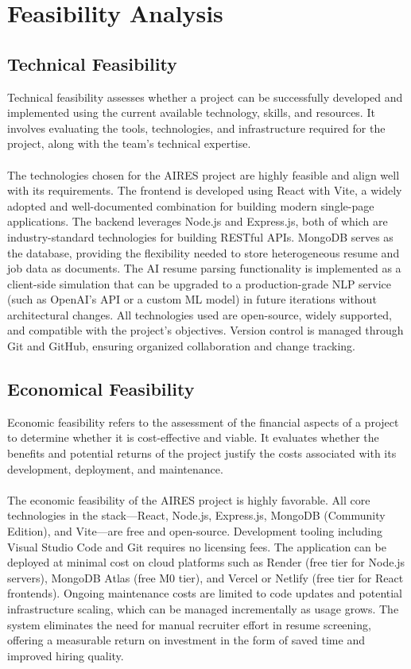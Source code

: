  \section{Feasibility Analysis}
 
 \subsection{Technical Feasibility}

 Technical feasibility assesses whether a project can be successfully developed and implemented using the current available technology, skills, and resources. It involves evaluating the tools, technologies, and infrastructure required for the project, along with the team's technical expertise.\\\\
 \noindent
The technologies chosen for the AIRES project are highly feasible and align well with its requirements. The frontend is developed using React with Vite, a widely adopted and well-documented combination for building modern single-page applications. The backend leverages Node.js and Express.js, both of which are industry-standard technologies for building RESTful APIs. MongoDB serves as the database, providing the flexibility needed to store heterogeneous resume and job data as documents. The AI resume parsing functionality is implemented as a client-side simulation that can be upgraded to a production-grade NLP service (such as OpenAI's API or a custom ML model) in future iterations without architectural changes. All technologies used are open-source, widely supported, and compatible with the project's objectives. Version control is managed through Git and GitHub, ensuring organized collaboration and change tracking.

 
 \subsection{Economical Feasibility}
 Economic feasibility refers to the assessment of the financial aspects of a project to determine whether it is cost-effective and viable. It evaluates whether the benefits and potential returns of the project justify the costs associated with its development, deployment, and maintenance.\\\\
 The economic feasibility of the AIRES project is highly favorable. All core technologies in the stack---React, Node.js, Express.js, MongoDB (Community Edition), and Vite---are free and open-source. Development tooling including Visual Studio Code and Git requires no licensing fees. The application can be deployed at minimal cost on cloud platforms such as Render (free tier for Node.js servers), MongoDB Atlas (free M0 tier), and Vercel or Netlify (free tier for React frontends). Ongoing maintenance costs are limited to code updates and potential infrastructure scaling, which can be managed incrementally as usage grows. The system eliminates the need for manual recruiter effort in resume screening, offering a measurable return on investment in the form of saved time and improved hiring quality.

